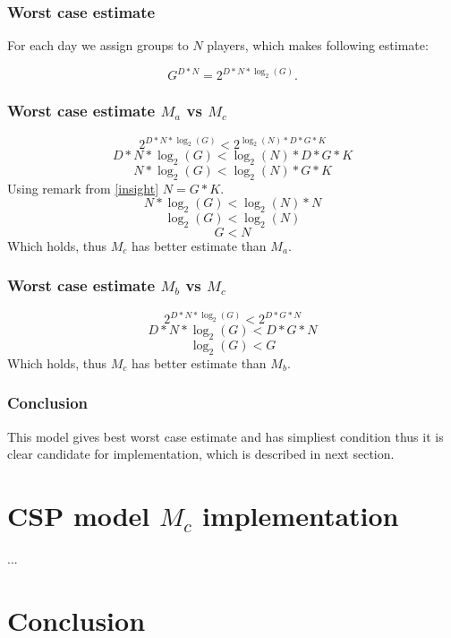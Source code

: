 \documentclass[a4paper]{article}
\theoremstyle{definition}
\theoremstyle{remark}
\begin{document}
\subsubsection{Worst case estimate}
For each day we assign groups to  $N$ players, which makes following estimate:

$$ G^{D*N} = 2^{D*N*\log_2(G)}.$$

\subsubsection{Worst case estimate $M_a$ vs $M_c$}
$$ 2^{D*N*\log_2(G)} < 2^{\log_2{(N)}*D*G*K}$$
$$ D*N*\log_2(G) < \log_2{(N)}*D*G*K $$
$$ N*\log_2(G) < \log_2{(N)}*G*K $$
Using remark from \ref{insight} $N = G*K$.
$$ N*\log_2(G) < \log_2{(N)}*N $$
$$ \log_2(G) < \log_2{(N)} $$
$$ G < N $$
Which holds, thus $M_c$ has better estimate than $M_a$.


\subsubsection{Worst case estimate $M_b$ vs $M_c$}
$$ 2^{D*N*\log_2(G)} < 2^{D*G*N}$$
$$ D*N*\log_2(G) < D*G*N$$
$$ \log_2(G) < G$$
Which holds, thus $M_c$ has better estimate than $M_b$.


\subsubsection{Conclusion}
This model gives best worst case estimate and has simpliest condition thus 
it is clear candidate for implementation, which is described in next section.

\section{CSP model $M_c$ implementation}
...

\section{Conclusion}
\end{document}
